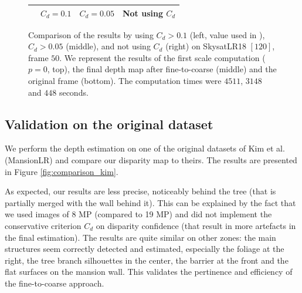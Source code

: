 \documentclass{article}
\theoremstyle{definition}
\begin{document}
\begin{figure}[ht]
\begin{tabular}{|c||c|c|c|}
  \hline
  & $C_d=0.1$ & $C_d=0.05$ & Not using $C_d$ \\ \hline
 \end{tabular}
 \caption{Comparison of the results by using $C_d > 0.1$ (left, value used in \cite{art:kim13:lfields}), $C_d > 0.05$ (middle), and not using $C_d$ (right) on SkysatLR18 $[120]$, frame $50$. We represent the results of the first scale computation ($p=0$, top), the final depth map after fine-to-coarse (middle) and the original frame (bottom). The computation times were $4511$, $3148$ and $448$ seconds.}
 \label{fig:c_d_comparison}
\end{figure}


\subsection{Validation on the original dataset} 


We perform the depth estimation on one of the original datasets of Kim et al. (MansionLR) and compare our disparity map to theirs. The results are presented in Figure \ref{fig:comparison_kim}. 

As expected, our results are less precise, noticeably behind the tree (that is partially merged with the wall behind it). This can be explained by the fact that we used images of 8 MP (compared to 19 MP) and did not implement the conservative criterion $C_d$ on disparity confidence (that result in more artefacts in the final estimation). The results are quite similar on other zones: the main structures seem correctly detected and estimated, especially the foliage at the right, the tree branch silhouettes in the center, the barrier at the front and the flat surfaces on the mansion wall. This validates the pertinence and efficiency of the fine-to-coarse approach.
\end{document}
